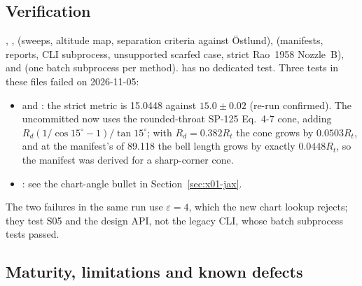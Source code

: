 \subsection{Verification}

, ,  (sweeps, altitude map, separation criteria against \"Ostlund),  (manifests, reports, CLI subprocess, unsupported scarfed case, strict Rao~1958 Nozzle~B),  and  (one batch subprocess per method).  has no dedicated test. Three tests in these files failed on 2026-11-05:
\begin{itemize}
\item {} and : the strict metric  is 15.0448 against $15.0\pm0.02$ (re-run confirmed). The uncommitted  now uses the rounded-throat SP-125 Eq.~4-7 cone, adding $R_d(1/\cos15^\circ-1)/\tan15^\circ$; with $R_d=0.382R_t$ the cone grows by $0.0503R_t$, and at the manifest's  of 89.118 the bell length grows by exactly $0.0448R_t$, so the manifest was derived for a sharp-corner cone.
\item {}: see the chart-angle bullet in Section~\ref{sec:x01-jax}.
\end{itemize}
The two  failures in the same run use $\varepsilon=4$, which the new chart lookup rejects; they test S05 and the design API, not the legacy CLI, whose batch subprocess tests passed.

\subsection{Maturity, limitations and known defects}

